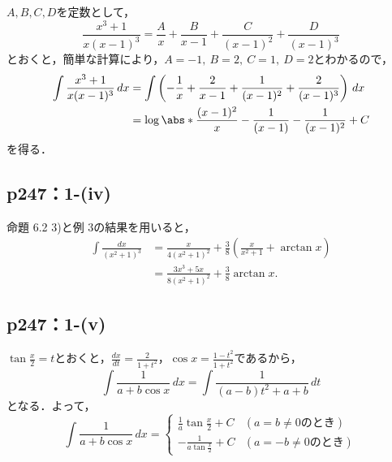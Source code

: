 \documentclass[uplatex,dvipdfmx,a4paper,10pt,fleqn]{jsarticle}
\begin{document}
\begin{tleftbar}
    $A,B,C,D$を定数として，
    \[
        \frac{x^3+1}{x(x-1)^3} = \frac{A}{x}+\frac{B}{x-1}+\frac{C}{(x-1)^2}+\frac{D}{(x-1)^3}
    \]
    とおくと，簡単な計算により，$A=-1,~B=2,~C=1,~D=2$とわかるので，
    \begin{align*}
        \int \frac{x^3+1}{x(x-1)^3} \, dx & = \int \left (-\frac{1}{x}+\frac{2}{x-1}+\frac{1}{(x-1)^2}+\frac{2}{(x-1)^3} \right ) \, dx \\
        & = \log \abs*{\frac{(x-1)^2}{x}} -\frac{1}{(x-1)}-\frac{1}{(x-1)^2}+ C
    \end{align*}
    を得る．
\end{tleftbar}


\subsection*{p247：1-(iv)}

\begin{leftbar}
    命題 6.2 3)と例 3の結果を用いると，
    \begin{align*}
      \int \frac{dx}{(x^2 + 1)^3}
      &= \frac{x}{4(x^2 + 1)^2} + \frac{3}{8}(\frac{x}{x^2 + 1} + \arctan x) \\
      &= \frac{3x^3 + 5x}{8(x^2+1)^2} + \frac{3}{8} \arctan x.
    \end{align*}
  \end{leftbar}

\subsection*{p247：1-(v)}


\begin{tleftbar}
    $\tan \frac{x}{2}=t$とおくと，$\frac{dx}{dt}=\frac{2}{1+t^2}$，$\cos x = \frac{1-t^2}{1+t^2}$であるから，
    \[
        \int \frac{1}{a+b \cos x} \, dx  = \int \frac{1}{(a-b)t^2 +a+b} \, dt
    \]
    となる．よって，
    \[
        \int \frac{1}{a+b\cos x} \, dx =
        \begin{cases}
            \frac{1}{a} \tan \frac{x}{2}+ C &(\text{$a=b \ne 0$のとき})\\
            -\frac{1}{a \tan \frac{x}{2}}+ C&(\text{$a=-b\ne 0$のとき})
        \end{cases}
    \]
    \end{tleftbar}
\end{document}
